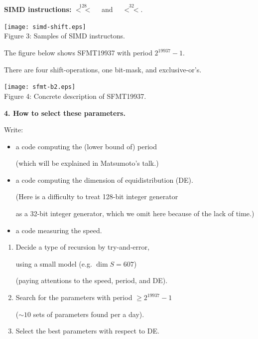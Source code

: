 \documentclass[a4j,12pt,landscape]{jarticle}
\begin{document}
\newpage
{\bf SIMD instructions:} 
$\stackrel{128}{<<}\quad$ and $\quad\stackrel{32}{<<}$.
\begin{center}
\texttt{[image: simd-shift.eps]}
\\
Figure 3: Samples of SIMD instructons.
\end{center}

\newpage
The figure below shows SFMT19937 with period $2^{19937}-1$.

There are four shift-operations, one bit-mask, and exclusive-or's.

\begin{center}
\texttt{[image: sfmt-b2.eps]}
\\
Figure 4: Concrete description of SFMT19937.
\end{center}

\newpage
{\bf 4. How to select these parameters.}

Write: 
\begin{itemize}
\item a code computing the (lower bound of) period

(which will be explained in Matsumoto's talk.)
\item  a code computing the dimension of equidistribution (DE).

(Here is a difficulty to treat 128-bit integer generator 

as a 32-bit integer generator,
which we omit here because of the lack of time.)
%

\item a code measuring the speed.
\end{itemize}

\newpage
\begin{enumerate}
\item 
Decide a type of recursion by try-and-error,

using a small model (e.g. $\dim S = 607$)

(paying attentions to the speed, period, and DE).
\item
Search for the parameters 
with period $\geq 2^{19937}-1$ 

($\sim 10$ sets of parameters found per a day).
\item
Select the best parameters with respect to DE.
\end{enumerate}
\end{document}

